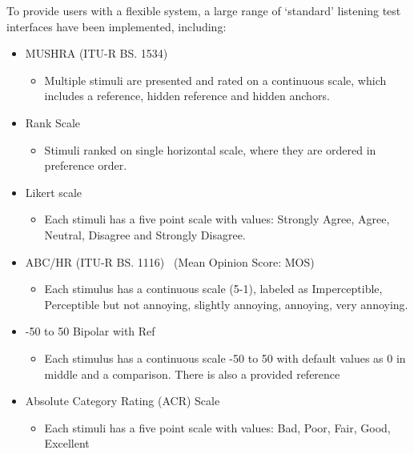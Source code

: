 \documentclass{sig-alternate}
\begin{document}
To provide users with a flexible system, a large range of `standard' listening test interfaces have been implemented, including: %
	\begin{itemize}[noitemsep,nolistsep]
		\item MUSHRA (ITU-R BS. 1534)~\cite{recommendation20031534}
		\begin{itemize}[noitemsep,nolistsep]
			\item Multiple stimuli are presented and rated on a continuous scale, which includes a reference, hidden reference and hidden anchors.
		\end{itemize}
		\item Rank Scale~\cite{pascoe1983evaluation}
		\begin{itemize}[noitemsep,nolistsep]
			\item Stimuli ranked on single horizontal scale, where they are ordered in preference order.
		\end{itemize}
		\item Likert scale~\cite{likert1932technique}
		\begin{itemize}[noitemsep,nolistsep]
			\item Each stimuli has a five point scale with values: Strongly Agree, Agree, Neutral, Disagree and Strongly Disagree.
		\end{itemize}
		\item ABC/HR (ITU-R BS. 1116)~\cite{recommendation19971116} (Mean Opinion Score: MOS)
		\begin{itemize}[noitemsep,nolistsep]
			\item Each stimulus has a continuous scale (5-1), labeled as Imperceptible, Perceptible but not annoying, slightly annoying, annoying, very annoying.
		\end{itemize}
		\item -50 to 50 Bipolar with Ref
		\begin{itemize}[noitemsep,nolistsep]
			\item Each stimulus has a continuous scale -50 to 50 with default values as 0 in middle and a comparison. There is also a provided reference		\end{itemize}
		\item Absolute Category Rating (ACR) Scale~\cite{rec1996p}
		\begin{itemize}[noitemsep,nolistsep]
			\item Each stimuli has a five point scale with values: Bad, Poor, Fair, Good, Excellent
		\end{itemize}

\end{itemize}
\end{document}
